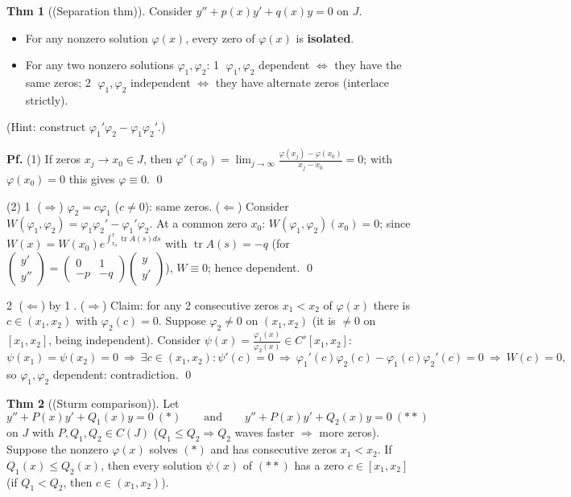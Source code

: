 \documentclass[11pt]{article}
\theoremstyle{definition}
\newtheorem*{theorem}{Thm}
\theoremstyle{remark}
\newcommand{\tr}{\operatorname{tr}}
\begin{document}
\begin{theorem}[(Separation thm)]
Consider $y''+p(x)y'+q(x)y=0$ on $J$.
\begin{itemize}
\item[(1)] For any nonzero solution $\varphi(x)$, every zero of $\varphi(x)$ is \textbf{isolated}.
\item[(2)] For any two nonzero solutions $\varphi_1,\varphi_2$: \textcircled{1}
$\varphi_1,\varphi_2$ dependent $\iff$ they have the same zeros; \textcircled{2}
$\varphi_1,\varphi_2$ independent $\iff$ they have alternate zeros (interlace strictly).
\end{itemize}
(Hint: construct $\varphi_1'\varphi_2-\varphi_1\varphi_2'$.)
\end{theorem}

\textbf{Pf.} (1) If zeros $x_j\to x_0\in J$, then
$\varphi'(x_0)=\lim_{j\to\infty}\frac{\varphi(x_j)-\varphi(x_0)}{x_j-x_0}=0$; with
$\varphi(x_0)=0$ this gives $\varphi\equiv0$. \qed

(2) \textcircled{1} ($\Rightarrow$) $\varphi_2=c\varphi_1$ ($c\neq0$): same zeros. ($\Leftarrow$)
Consider $W(\varphi_1,\varphi_2)=\varphi_1\varphi_2'-\varphi_1'\varphi_2$. At a common zero
$x_0$: $W(\varphi_1,\varphi_2)(x_0)=0$; since
$W(x)=W(x_0)e^{\int_{x_0}^{x}\tr A(s)ds}$ with $\tr A(s)=-q$ (for
$\begin{pmatrix}y'\\y''\end{pmatrix}=\begin{pmatrix}0&1\\-p&-q\end{pmatrix}\begin{pmatrix}y\\y'\end{pmatrix}$),
$W\equiv0$; hence dependent. \qed

\textcircled{2} ($\Leftarrow$) by \textcircled{1}. ($\Rightarrow$) Claim: for any 2 consecutive
zeros $x_1<x_2$ of $\varphi(x)$ there is $c\in(x_1,x_2)$ with $\varphi_2(c)=0$. Suppose
$\varphi_2\neq0$ on $(x_1,x_2)$ (it is $\neq0$ on $[x_1,x_2]$, being independent). Consider
$\psi(x)=\frac{\varphi_1(x)}{\varphi_2(x)}\in C'[x_1,x_2]$:
\[
\psi(x_1)=\psi(x_2)=0\ \Rightarrow\ \exists c\in(x_1,x_2): \psi'(c)=0
\ \Rightarrow\ \varphi_1'(c)\varphi_2(c)-\varphi_1(c)\varphi_2'(c)=0\ \Rightarrow\ W(c)=0,
\]
so $\varphi_1,\varphi_2$ dependent: contradiction. \qed

\begin{theorem}[(Sturm comparison)]
Let
\[
y''+P(x)y'+Q_1(x)y=0\ (*) \qquad\text{and}\qquad y''+P(x)y'+Q_2(x)y=0\ (**)
\]
on $J$ with $P,Q_1,Q_2\in C(J)$ ($Q_1\le Q_2 \Rightarrow Q_2$ waves faster $\Rightarrow$ more
zeros). Suppose the nonzero $\varphi(x)$ solves $(*)$ and has consecutive zeros $x_1<x_2$. If
$Q_1(x)\le Q_2(x)$, then every solution $\psi(x)$ of $(**)$ has a zero
$c\in[x_1,x_2]$ (if $Q_1<Q_2$, then $c\in(x_1,x_2)$).
\end{theorem}
\end{document}

